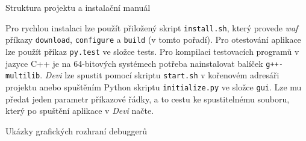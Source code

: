 \documentclass[czech,bachelor,male,python,dept460,hidelinks]{diploma}						%
\newcommand{\parspace}[1][]{
	\ifthenelse{\isempty{#1}}{\vspace{5mm}}{\vspace{#1}}
	\par
}
\begin{document}
\begin{section}{Struktura projektu a instalační manuál}
	\parspace Pro rychlou instalaci lze použít přiložený skript \texttt{install.sh}, který provede \textit{waf} příkazy \texttt{download}, \texttt{configure}
	a \texttt{build} (v tomto pořadí).
	Pro otestování aplikace lze použít příkaz \texttt{py.test} ve složce tests. Pro kompilaci testovacích programů v jazyce C++ je na 64-bitových systémech
	potřeba nainstalovat balíček \texttt{g++-multilib}.
	\textit{Devi} lze spustit pomocí skriptu \texttt{start.sh} v kořenovém adresáři projektu anebo spuštěním Python skriptu \texttt{initialize.py}
	ve složce \texttt{gui}. Lze mu předat jeden parametr příkazové řádky, a to cestu ke spustitelnému souboru, který po spuštění aplikace v \textit{Devi} načte.
\end{section}

\begin{section}{Ukázky grafických rozhraní debuggerů}
\label{appendix:gui}
\end{section}

\clearpage
\end{document}
